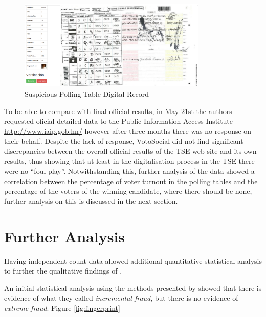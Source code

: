 \documentclass[letterpaper,10pt]{article}
\begin{document}
\begin{figure}[h!]
    \centering
    \includegraphics[width=0.8\textwidth]{images/vs-valid-strange}
    \caption{Suspicious Polling Table Digital Record}
    \label{fig:strange}
\end{figure}

To be able to compare with final official results, in May 21st the authors requested oficial detailed data to the Public Information Access Institute \url{http://www.iaip.gob.hn/} however after three months there was no response on their behalf. Despite the lack of response, VotoSocial did not find significant discrepancies between the overall official results of the TSE web site and its own results, thus showing that at least in the digitalisation process in the TSE there were no ``foul play''. Notwithstanding this, further analysis of the data showed a correlation between the percentage of voter turnout in the polling tables and the percentage of the voters of the winning candidate, where there should be none, further analysis on this is discussed in the next section.




\section{Further Analysis}
Having independent count data allowed additional quantitative statistical analysis to further the qualitative findings of \cite{gonza2014}.

An initial statistical analysis using the methods presented by \cite{klimek2012} showed that there is evidence of what they called \textit{incremental fraud}, but there is no evidence of \textit{extreme fraud}. Figure \ref{fig:fingerprint}
\end{document}
